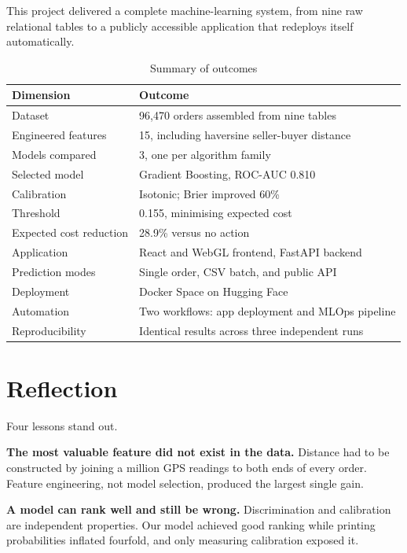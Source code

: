 \documentclass[11pt,a4paper]{report}
\begin{document}
This project delivered a complete machine-learning system, from nine raw
relational tables to a publicly accessible application that redeploys itself
automatically.

\begin{table}[H]
\centering
\caption{Summary of outcomes}
\begin{tabular}{@{}ll@{}}
\toprule
\textbf{Dimension} & \textbf{Outcome} \\
\midrule
Dataset & 96{,}470 orders assembled from nine tables \\
Engineered features & 15, including haversine seller-buyer distance \\
Models compared & 3, one per algorithm family \\
Selected model & Gradient Boosting, ROC-AUC 0.810 \\
Calibration & Isotonic; Brier improved 60\% \\
Threshold & 0.155, minimising expected cost \\
Expected cost reduction & 28.9\% versus no action \\
Application & React and WebGL frontend, FastAPI backend \\
Prediction modes & Single order, CSV batch, and public API \\
Deployment & Docker Space on Hugging Face \\
Automation & Two workflows: app deployment and MLOps pipeline \\
Reproducibility & Identical results across three independent runs \\
\bottomrule
\end{tabular}
\end{table}

\section{Reflection}

Four lessons stand out.

\textbf{The most valuable feature did not exist in the data.} Distance had to be
constructed by joining a million GPS readings to both ends of every order.
Feature engineering, not model selection, produced the largest single gain.

\textbf{A model can rank well and still be wrong.} Discrimination and calibration
are independent properties. Our model achieved good ranking while printing
probabilities inflated fourfold, and only measuring calibration exposed it.
\end{document}
